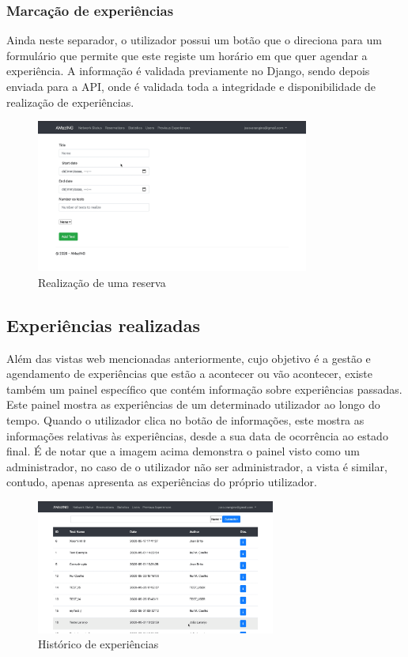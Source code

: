 \subsubsection{Marcação de experiências}
Ainda neste separador, o utilizador possui um botão que o direciona para um formulário que permite que este registe um horário em que quer agendar a experiência. A informação é validada previamente no Django, sendo depois  enviada para a API, onde é validada toda a integridade e disponibilidade de realização de experiências.
\begin{figure}[!ht]
    \centering
    \includegraphics[width=0.8\textwidth]{images/make_reservation.png}
    \caption{Realização de uma reserva}
    \label{fig:reserva}
\end{figure}

\subsection{Experiências realizadas}
Além das vistas web mencionadas anteriormente, cujo objetivo é a gestão e agendamento de experiências que estão a acontecer ou vão acontecer, existe também um painel específico que contém informação sobre experiências passadas.\newline
Este painel mostra as experiências de um determinado utilizador ao longo do tempo. Quando o utilizador clica no botão de informações, este mostra as informações relativas às experiências, desde a sua data de ocorrência ao estado final.
É de notar que a imagem acima demonstra o painel visto como um administrador, no caso de o utilizador não ser administrador, a vista é similar, contudo, apenas apresenta as experiências do próprio utilizador.
\begin{figure}[!ht]
    \centering
    \includegraphics[width=0.7\textwidth]{images/previous_experiences.png}
    \caption{Histórico de experiências}
    \label{fig:historico}
\end{figure}

